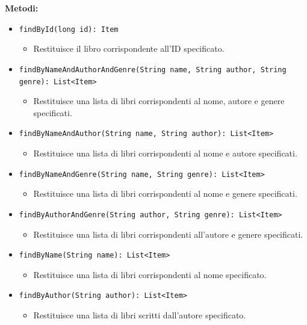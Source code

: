 \documentclass[twoside,openright,titlepage,fleqn,headinclude,12pt,a4paper,BCOR=5mm,footinclude]{scrbook}
\begin{document}
\textbf{Metodi:}  
\begin{itemize}  
    \item \texttt{findById(long id): Item}  
    \begin{itemize}  
        \item Restituisce il libro corrispondente all’ID specificato.  
    \end{itemize}  

    \item \texttt{findByNameAndAuthorAndGenre(String name, String author, String genre): List<Item>}  
    \begin{itemize}  
        \item Restituisce una lista di libri corrispondenti al nome, autore e genere specificati.  
    \end{itemize}  

    \item \texttt{findByNameAndAuthor(String name, String author): List<Item>}  
    \begin{itemize}  
        \item Restituisce una lista di libri corrispondenti al nome e autore specificati.  
    \end{itemize}  

    \item \texttt{findByNameAndGenre(String name, String genre): List<Item>}  
    \begin{itemize}  
        \item Restituisce una lista di libri corrispondenti al nome e genere specificati.  
    \end{itemize}  

    \item \texttt{findByAuthorAndGenre(String author, String genre): List<Item>}  
    \begin{itemize}  
        \item Restituisce una lista di libri corrispondenti all'autore e genere specificati.  
    \end{itemize}  

    \item \texttt{findByName(String name): List<Item>}  
    \begin{itemize}  
        \item Restituisce una lista di libri corrispondenti al nome specificato.  
    \end{itemize}  

    \item \texttt{findByAuthor(String author): List<Item>}  
    \begin{itemize}  
        \item Restituisce una lista di libri scritti dall'autore specificato.  
    \end{itemize}  


\end{itemize}
\end{document}

